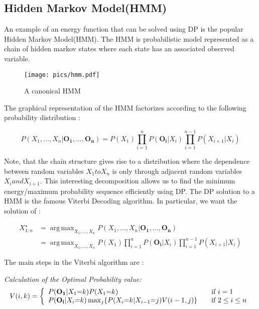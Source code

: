 \documentclass{article}
\DeclareMathOperator*{\argmax}{arg\,max}
\begin{document}
\subsection{Hidden Markov Model(HMM)}
An example of an energy function that can be solved using DP is the popular Hidden Markov Model(HMM). The HMM is probabilistic model represented as a chain of hidden markov states where each state has an associated observed variable. 

\begin{figure}[h!]
    \centering
    \texttt{[image: pics/hmm.pdf]}
    \caption{A canonical HMM}
    \label{hmm1}
\end{figure}


The graphical representation of the HMM factorizes according to the following probability distribution :

\begin{equation}
P(X_1,\ldots,X_n|\mathbf{O_1},\ldots,\mathbf{O_n}) = P(X_1)\prod_{i=1}^{n}{P(\mathbf{O_i}|X_i)}\prod_{i=1}^{n-1}{P(X_{i+1}|X_i)}
\end{equation}

Note, that the chain structure gives rise to a distribution where the dependence between random variables $X_1 to X_n$ is only through adjacent random variables $X_i and X_{i+1}$. This interesting decomposition allows us to find the minimum energy/maximum probability sequence efficiently using DP. The DP solution to a HMM is the famous Viterbi Decoding algorithm. In particular, we want the solution of :

\begin{align*}
X^\star_{1:n} &= \argmax_{X_1,\ldots ,X_n} P(X_1,\ldots,X_n|\mathbf{O_1},\ldots,\mathbf{O_n})\\
  &= \argmax_{X_1,\ldots ,X_n}P(X_1)\prod_{i=1}^{n}{P(\mathbf{O_i}|X_i)}\prod_{i=1}^{n-1}{P(X_{i+1}|X_i)}
\end{align*}


The main steps in the Viterbi algorithm are : 

\vspace*{0.2in}

\textit{Calculation of the Optimal Probability value:}
\[
  V(i,k) = \left\{
  \begin{array}{l l}
    P(\mathbf{O_1}|X_1{=}k)P(X_1{=}k) & \quad \text{if $i=1$}\\
    P(\mathbf{O_i}|X_i{=}k)\max_{j}\{P(X_{i}{=}k|X_{i-1}{=}j)V(i-1,j)\} & \quad \text{if $2\leq i\leq n$}\\
  \end{array} \right.
\]
\end{document}
